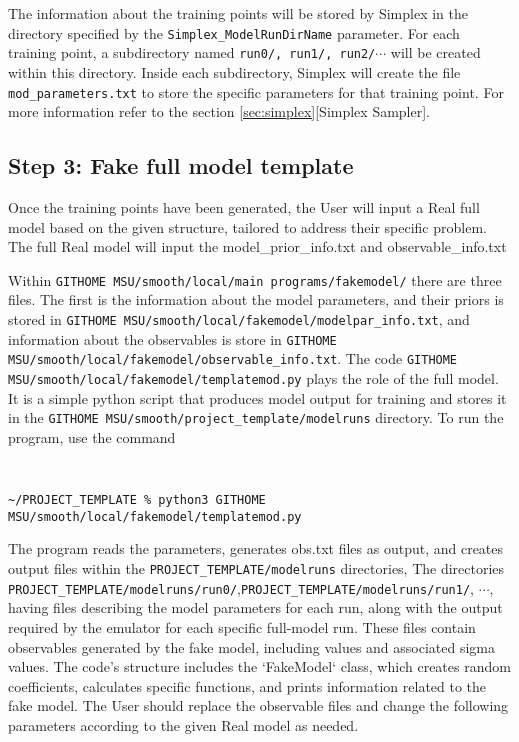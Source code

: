 \documentclass[main.tex]{subfiles}
\begin{document}
The information about the training points will be stored by Simplex in the directory specified by the {\tt Simplex\_ModelRunDirName} parameter. For each training point, a subdirectory named {\tt run0/, run1/, run2/}$\cdots$ will be created within this directory. Inside each subdirectory, Simplex will create the file {\tt mod\_parameters.txt} to store the specific parameters for that training point. For more information refer to the section \ref{sec:simplex}[Simplex Sampler].


\subsection{Step 3: Fake full model template}
Once the training points have been generated, the User will input a Real full model based on the given structure, tailored to address their specific problem. The full Real model will input the model\_prior\_info.txt and observable\_info.txt

Within {\tt GITHOME MSU/smooth/local/main programs/fakemodel/} there are three files. The first is the information about the model parameters, and their priors is stored in {\tt GITHOME MSU/smooth/local/fakemodel/modelpar\_info.txt}, and information about the observables is store in {\tt GITHOME MSU/smooth/local/fakemodel/observable\_info.txt}. The code
{\tt GITHOME MSU/smooth/local/fakemodel/templatemod.py} plays the role of the full model. It is a simple python script that produces model output for training and stores it in the {\tt GITHOME MSU/smooth/project\_template/modelruns} directory. 
To run the program, use the command\

\vspace{-20pt}
{\tt
\begin{verbatim}
~/PROJECT_TEMPLATE % python3 GITHOME MSU/smooth/local/fakemodel/templatemod.py
\end{verbatim}
}
The program reads the parameters, generates obs.txt files as output, and creates output files within the {\tt PROJECT\_TEMPLATE/modelruns} directories, The directories
{\tt  PROJECT\_TEMPLATE/modelruns/run0/},{\tt  PROJECT\_TEMPLATE/modelruns/run1/}, $\cdots$, having files describing the model parameters for each run, along with the output required by the emulator for each specific full-model run. These files contain observables generated by the fake model, including values and associated sigma values. The code's structure includes the `FakeModel` class, which creates random coefficients, calculates specific functions, and prints information related to the fake model. The User should replace the observable files and change the following parameters according to the given Real model as needed.
\end{document}
